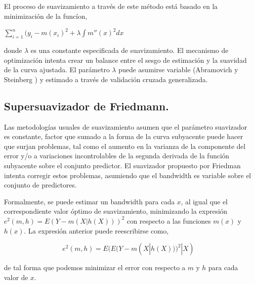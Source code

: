 \hspace*{0.4 cm}El proceso de suavizamiento a trav\'es de este m\'etodo est\'a basado en la minimizaci\'on de la func\'ion,

\begin{center}
$\displaystyle{ \sum_{i=1}^{n} (y_{i}-m(x_{i})^2 + \lambda \int m''(x)^2dx  }$
\end{center}

\vspace*{0.2 cm}

\noindent donde $\lambda$ es una constante especificada de suavizamiento. El mecanismo de optimizaci\'on intenta crear un balance entre el sesgo de estimaci\'on y la suavidad de la curva ajustada. El par\'ametro $\lambda$ puede asumirse variable (Abramovich y Steinberg \cite{AS}) y estimado a trav\'es de validaci\'on cruzada generalizada.

\subsection{Supersuavizador de Friedmann.\\}


\hspace*{0.4 cm} Las metodolog\'ias usuales de suavizamiento asumen que el par\'ametro suavizador es constante, factor que sumado a la forma de la curva subyacente puede hacer que surjan problemas, tal como el aumento en la varianza de la componente del error y/o a variaciones incontrolables de la segunda derivada de la funci\'on subyacente sobre el conjunto predictor. El suavizador propuesto por Friedman \cite{F} intenta corregir estos problemas, asumiendo que el bandwidth es variable sobre el conjunto de predictores.


\hspace*{0.4 cm} Formalmente, se puede estimar un bandwidth para cada $x$, al igual que el correspondiente valor \'optimo de suavizamiento, minimizando la expresi\'on $e^{2}(m,h) = E(Y - m(X|h(X)))^2$ con respecto a las funciones $m(x)$ y $h(x)$. La expresi\'on anterior puede reescribirse como,

\vspace*{0.2 cm}

\begin{equation}
e^{2}(m,h) = E(E(Y - m(X|h(X)))^2|X)
\label{friedman}
\end{equation}

\vspace*{0.2 cm}

\noindent de tal forma que podemos minimizar el error con respecto a $m$ y $h$ para cada valor de $x$.

